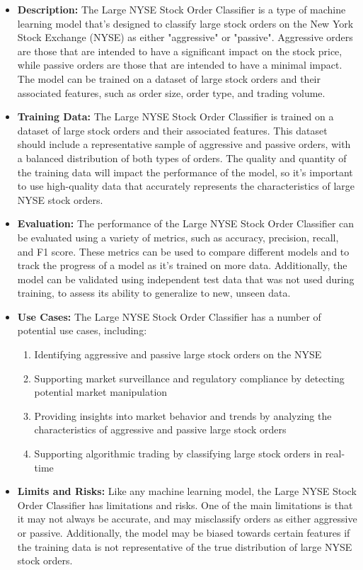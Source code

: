 \begin{itemize}
    \item \textbf{Description:} The Large NYSE Stock Order Classifier is a type of machine learning model that's designed to classify large stock orders on the New York Stock Exchange (NYSE) as either "aggressive" or "passive". Aggressive orders are those that are intended to have a significant impact on the stock price, while passive orders are those that are intended to have a minimal impact. The model can be trained on a dataset of large stock orders and their associated features, such as order size, order type, and trading volume.
    \item \textbf{Training Data:} The Large NYSE Stock Order Classifier is trained on a dataset of large stock orders and their associated features. This dataset should include a representative sample of aggressive and passive orders, with a balanced distribution of both types of orders. The quality and quantity of the training data will impact the performance of the model, so it's important to use high-quality data that accurately represents the characteristics of large NYSE stock orders.
    \item \textbf{Evaluation:} The performance of the Large NYSE Stock Order Classifier can be evaluated using a variety of metrics, such as accuracy, precision, recall, and F1 score. These metrics can be used to compare different models and to track the progress of a model as it's trained on more data. Additionally, the model can be validated using independent test data that was not used during training, to assess its ability to generalize to new, unseen data.
    \item \textbf{Use Cases:} The Large NYSE Stock Order Classifier has a number of potential use cases, including:
        \begin{enumerate}  
            \item Identifying aggressive and passive large stock orders on the NYSE
            \item Supporting market surveillance and regulatory compliance by detecting potential market manipulation
            \item Providing insights into market behavior and trends by analyzing the characteristics of aggressive and passive large stock orders
            \item Supporting algorithmic trading by classifying large stock orders in real-time
        \end{enumerate}
    \item \textbf{Limits and Risks:} Like any machine learning model, the Large NYSE Stock Order Classifier has limitations and risks. One of the main limitations is that it may not always be accurate, and may misclassify orders as either aggressive or passive. Additionally, the model may be biased towards certain features if the training data is not representative of the true distribution of large NYSE stock orders.

\end{itemize}
